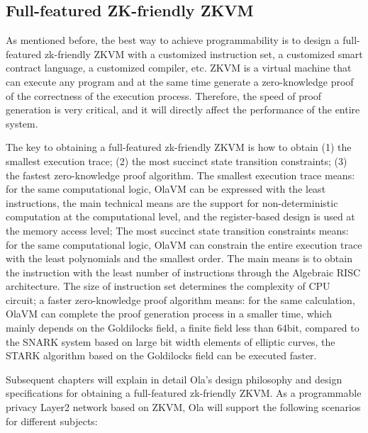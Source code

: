 \subsection{Full-featured ZK-friendly ZKVM}

As mentioned before, the best way to achieve programmability is to design a full-featured zk-friendly ZKVM with a customized instruction set, a customized smart contract language, a customized compiler, etc. 
ZKVM is a virtual machine that can execute any program and at the same time generate a zero-knowledge proof of the correctness of the execution process. Therefore, the speed of proof generation 
is very critical, and it will directly affect the performance of the entire system.

The key to obtaining a full-featured zk-friendly ZKVM is how to obtain (1) the smallest execution trace; (2) the most succinct state transition constraints; (3) the fastest 
zero-knowledge proof algorithm. The smallest execution trace means: for the same computational logic, OlaVM\cite{website:OlaVM} can be expressed with the least instructions, the main technical means are the 
support for non-deterministic computation at the computational level, and the register-based design is used at the memory access level; The most succinct state transition constraints means: 
for the same computational logic, OlaVM\cite{website:OlaVM} can constrain the entire execution trace with the least polynomials and the smallest order. The main means is to obtain the instruction with the least 
number of instructions through the Algebraic RISC architecture. The size of instruction set determines the complexity of CPU circuit; a faster zero-knowledge proof algorithm 
means: for the same calculation, OlaVM\cite{website:OlaVM} can complete the proof generation process in a smaller time, which mainly depends on the Goldilocks\cite{website:Goldilocks} field, a finite field less than 64bit, compared to the 
SNARK system based on large bit width elements of elliptic curves, the STARK algorithm based on the Goldilocks\cite{website:Goldilocks} field can be executed faster.

Subsequent chapters will explain in detail Ola's design philosophy and design specifications for obtaining a full-featured zk-friendly ZKVM. As a programmable privacy Layer2 network 
based on ZKVM, Ola will support the following scenarios for different subjects:

